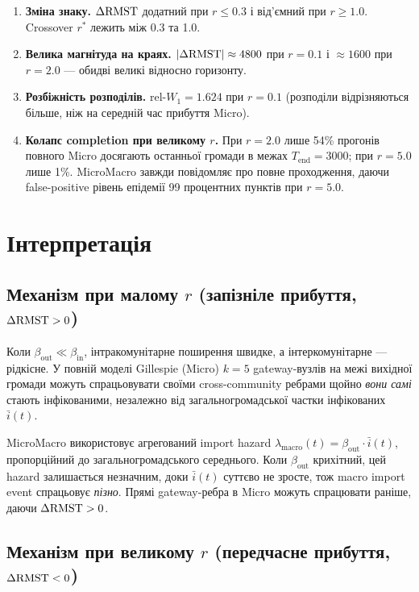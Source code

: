 \documentclass[11pt,a4paper]{article}
\begin{document}
\begin{enumerate}
  \item \textbf{Зміна знаку.}  $\Delta\mathrm{RMST}$ додатний при $r \le 0.3$ і
        від'ємний при $r \ge 1.0$.  Crossover $r^*$ лежить між 0.3 та 1.0.
  \item \textbf{Велика магнітуда на краях.}  $|\Delta\mathrm{RMST}| \approx 4800$ при $r=0.1$
        і $\approx 1600$ при $r=2.0$ --- обидві великі відносно горизонту.
  \item \textbf{Розбіжність розподілів.}  $\text{rel-}W_1 = 1.624$ при $r=0.1$
        (розподіли відрізняються більше, ніж на середній час прибуття Micro).
  \item \textbf{Колапс completion при великому $r$.}  При $r=2.0$ лише 54\%
        прогонів повного Micro досягають останньої громади в межах $T_{\text{end}}=3000$;
        при $r=5.0$ лише 1\%.  MicroMacro завжди повідомляє про повне проходження,
        даючи false-positive рівень епідемії 99 процентних пунктів при $r=5.0$.
\end{enumerate}

\section{Інтерпретація}

\subsection{Механізм при малому $r$ (запізніле прибуття, $\Delta\mathrm{RMST} > 0$)}

Коли $\beta_{\text{out}} \ll \beta_{\text{in}}$, інтракомунітарне поширення швидке,
а інтеркомунітарне --- рідкісне.  У повній моделі Gillespie (Micro)
$k=5$ gateway-вузлів на межі вихідної громади можуть спрацьовувати своїми
cross-community ребрами щойно \emph{вони самі} стають інфікованими,
незалежно від загальногромадської частки інфікованих $\bar{i}(t)$.

MicroMacro використовує агрегований import hazard
$\lambda_{\text{macro}}(t) = \beta_{\text{out}} \cdot \bar{i}(t)$,
пропорційний до загальногромадського середнього.  Коли $\beta_{\text{out}}$
крихітний, цей hazard залишається незначним, доки $\bar{i}(t)$ суттєво не зросте,
тож macro import event спрацьовує \emph{пізно}.  Прямі gateway-ребра в Micro
можуть спрацювати раніше, даючи $\Delta\mathrm{RMST} > 0$.

\subsection{Механізм при великому $r$ (передчасне прибуття, $\Delta\mathrm{RMST} < 0$)}
\end{document}
